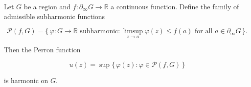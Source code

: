 Let $G$ be a region and $f: \partial_\infty G \to \mathbb{R}$ a continuous function. Define the family of admissible subharmonic functions

$$\mathcal{P}(f, G) = \{\, \varphi: G \to \mathbb{R} \text{ subharmonic} : \limsup_{z \to a} \varphi(z) \leq f(a) \text{ for all } a \in \partial_\infty G \,\}.$$

Then the Perron function

$$u(z) = \sup \{\, \varphi(z) : \varphi \in \mathcal{P}(f, G) \,\}$$

is harmonic on $G$.
